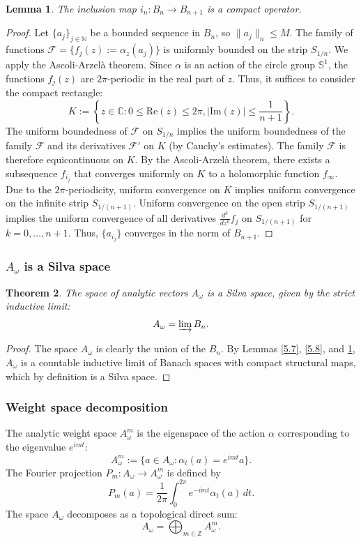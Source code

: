 \documentclass[11pt,reqno]{amsart}
\newtheorem{theorem}{Theorem}[section]
\newtheorem{lemma}[theorem]{Lemma}
\theoremstyle{definition}
\numberwithin{equation}{section}
\begin{document}
\begin{lemma}\label{5.9}
The inclusion map $i_n: B_n \rightarrow B_{n+1}$ is a compact operator.
\end{lemma}

\begin{proof}
Let $\{a_j\}_{j \in \mathbb{N}}$ be a bounded sequence in $B_n$, so $\|a_j\|_n \le M$. The family of functions $\mathcal{F} = \{f_j(z) := \alpha_z(a_j)\}$ is uniformly bounded on the strip $S_{1/n}$. We apply the Ascoli-Arzelà theorem. Since $\alpha$ is an action of the circle group $\mathbb{S}^1$, the functions $f_j(z)$ are $2\pi$-periodic in the real part of $z$. Thus, it suffices to consider the compact rectangle:
\[
K := \left\{z \in \mathbb{C} : 0 \le \text{Re}(z) \le 2\pi, |\text{Im}(z)| \le \frac{1}{n+1} \right\}.
\]
The uniform boundedness of $\mathcal{F}$ on $S_{1/n}$ implies the uniform boundedness of the family $\mathcal{F}$ and its derivatives $\mathcal{F}'$ on $K$ (by Cauchy’s estimates). The family $\mathcal{F}$ is therefore equicontinuous on $K$. By the Ascoli-Arzelà theorem, there exists a subsequence $f_{i_j}$ that converges uniformly on $K$ to a holomorphic function $f_{\infty}$. Due to the $2\pi$-periodicity, uniform convergence on $K$ implies uniform convergence on the infinite strip $S_{1/(n+1)}$. Uniform convergence on the open strip $S_{1/(n+1)}$ implies the uniform convergence of all derivatives $\frac{d^k}{dz^k}f_j$ on $S_{1/(n+1)}$ for $k = 0, \dots, n+1$. Thus, $\{a_{i_j}\}$ converges in the norm of $B_{n+1}$.
\end{proof}

\subsubsection{$A_{\omega}$ is a Silva space}

\begin{theorem}
The space of analytic vectors $A_{\omega}$ is a Silva space, given by the strict inductive limit:
\[
A_{\omega} = \varinjlim B_n.
\]
\end{theorem}

\begin{proof}
The space $A_{\omega}$ is clearly the union of the $B_n$. By Lemmas \ref{5.7}, \ref{5.8}, and \ref{5.9}, $A_{\omega}$ is a countable inductive limit of Banach spaces with compact structural maps, which by definition is a Silva space.
\end{proof}

\subsubsection{Weight space decomposition}
The analytic weight space $A_{\omega}^m$ is the eigenspace of the action $\alpha$ corresponding to the eigenvalue $e^{imt}$:
\[
A_{\omega}^m := \{a \in A_{\omega} : \alpha_t(a) = e^{imt}a\}.
\]
The Fourier projection $P_m : A_{\omega} \rightarrow A_{\omega}^m$ is defined by
\[
P_m(a) = \frac{1}{2\pi} \int_0^{2\pi} e^{-imt}\alpha_t(a) \, dt.
\]
The space $A_{\omega}$ decomposes as a topological direct sum:
\[
A_{\omega} = \bigoplus_{m \in \mathbb{Z}} A_{\omega}^m.
\]
\end{document}
